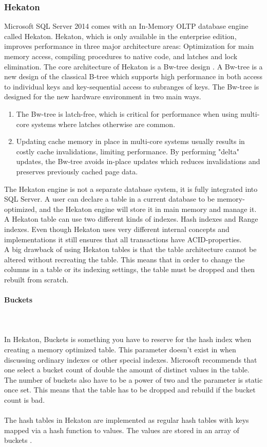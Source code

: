\documentclass{cslthse-msc}
\begin{document}
\subsubsection{Hekaton}
Microsoft SQL Server 2014 comes with an In-Memory OLTP database engine called Hekaton. Hekaton, which is only available in the enterprise edition, improves performance in three major architecture areas: Optimization for main memory access, compiling procedures to native code, and latches and lock elimination. The core architecture of Hekaton is a Bw-tree design   \cite{Levandoski14}. A Bw-tree is a new design of the classical B-tree which supports high performance in both access to individual keys and key-sequential access to subranges of keys. The Bw-tree is designed for the new hardware environment in two main ways. 
\begin{enumerate}
\item The Bw-tree is latch-free, which is critical for performance when using multi-core systems where latches otherwise are common.
\item Updating cache memory in place in multi-core systems usually results in costly cache invalidations, limiting performance. By performing "delta" updates, the Bw-tree avoids in-place updates which reduces invalidations and preserves previously cached page data.
\end{enumerate} 
The Hekaton engine is not a separate database system, it is fully integrated into SQL Server. A user can declare a table in a current database to be memory-optimized, and the Hekaton engine will store it in main memory and manage it. A Hekaton table can use two different kinds of indexes. Hash indexes and Range indexes.  Even though Hekaton uses very different internal concepts and implementations it still ensures that all transactions have ACID-properties. \\
A big drawback of using Hekaton tables is that the table architecture cannot be altered without recreating the table. This means that in order to change the columns in a table or its indexing settings, the table must be dropped and then rebuilt from scratch.

\paragraph*{Buckets}\mbox{}\\\\
In Hekaton, Buckets is something you have to reserve for the hash index when creating a memory optimized table. This parameter doesn't exist in when discussing ordinary indexes or other special indexes. Microsoft recommends that one select a bucket count of double the amount of distinct values in the table. The number of buckets also have to be a power of two and the parameter is static once set. This means that the table has to be dropped and rebuild if the bucket count is bad. \\\\
The hash tables in Hekaton are implemented as regular hash tables with keys mapped via a hash function to values. The values are stored in an array of buckets   \cite{Barbarin14}. 
\end{document}
